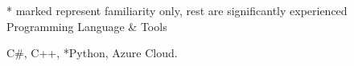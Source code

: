 \begin{cventries}
    
    \cventry
    {* marked represent familiarity only, rest are significantly experienced}
    {Programming Language \& Tools}
    {}
    {}
    {
      \begin{cvitems}
        \item {C\#, C++, *Python, Azure Cloud.}
      \end{cvitems}
    }
  
\end{cventries}
